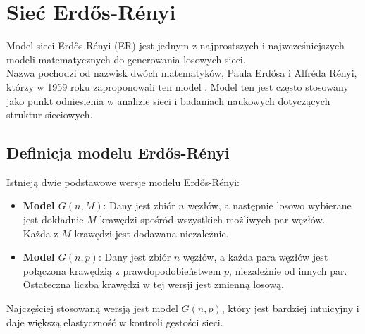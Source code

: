 \section{Sieć Erdős-Rényi}
Model sieci Erdős-Rényi (ER) jest jednym z najprostszych i najwcześniejszych modeli matematycznych do generowania losowych sieci.
\\ Nazwa pochodzi od nazwisk dwóch matematyków, Paula Erdősa i Alfréda Rényi, którzy w 1959 roku zaproponowali ten model \cite{Erdos1959}.
Model ten jest często stosowany jako punkt odniesienia w analizie sieci i badaniach naukowych dotyczących struktur sieciowych.

\subsection{Definicja modelu Erdős-Rényi}
Istnieją dwie podstawowe wersje modelu Erdős-Rényi:

\begin{itemize}
      \item \textbf{Model $G(n, M)$}: Dany jest zbiór $n$ węzłów, a następnie losowo wybierane jest dokładnie $M$ krawędzi spośród wszystkich możliwych par węzłów.
            \\ Każda z $M$ krawędzi jest dodawana niezależnie.
      \item \textbf{Model $G(n, p)$}: Dany jest zbiór $n$ węzłów, a każda para węzłów jest połączona krawędzią z prawdopodobieństwem $p$, niezależnie od innych par.
            \\ Ostateczna liczba krawędzi w tej wersji jest zmienną losową.
\end{itemize}

Najczęściej stosowaną wersją jest model $G(n, p)$, który jest bardziej intuicyjny i daje większą elastyczność w kontroli gęstości sieci.

